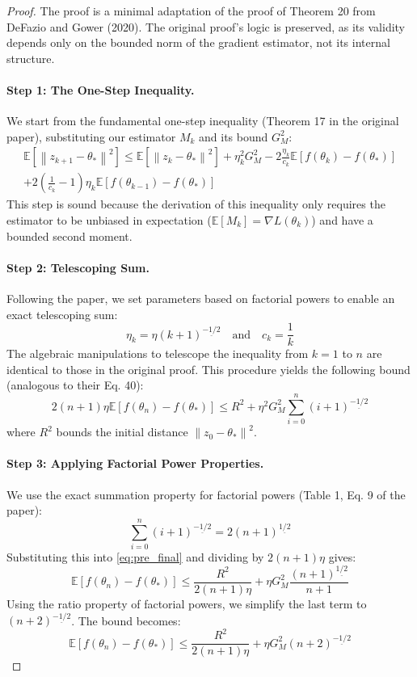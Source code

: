 \documentclass{article}
\newcommand{\E}{\mathbb{E}}
\newcommand{\norm}[1]{\left\lVert#1\right\rVert}
\newcommand{\grad}{\nabla}
\begin{document}
\begin{proof}
The proof is a minimal adaptation of the proof of Theorem 20 from DeFazio and Gower (2020). The original proof's logic is preserved, as its validity depends only on the bounded norm of the gradient estimator, not its internal structure.

\paragraph{Step 1: The One-Step Inequality.}
We start from the fundamental one-step inequality (Theorem 17 in the original paper), substituting our estimator \(M_k\) and its bound \(G_M^2\):
\begin{align}
    \E[\norm{z_{k+1} - \theta_*}^2] \le \E[\norm{z_k - \theta_*}^2] + \eta_k^2 G_M^2 - 2\frac{\eta_k}{c_k}\E[f(\theta_k) - f(\theta_*)] \nonumber \\
    + 2\left(\frac{1}{c_k}-1\right)\eta_k \E[f(\theta_{k-1}) - f(\theta_*)] \label{eq:onestep}
\end{align}
This step is sound because the derivation of this inequality only requires the estimator to be unbiased in expectation (\(\E[M_k] = \grad L(\theta_k)\)) and have a bounded second moment.

\paragraph{Step 2: Telescoping Sum.}
Following the paper, we set parameters based on factorial powers to enable an exact telescoping sum:
\[ \eta_k = \eta (k+1)^{\underline{-1/2}} \quad \text{and} \quad c_k = \frac{1}{k} \]
The algebraic manipulations to telescope the inequality from \(k=1\) to \(n\) are identical to those in the original proof. This procedure yields the following bound (analogous to their Eq. 40):
\begin{equation}
    2(n+1)\eta\E[f(\theta_n) - f(\theta_*)] \le R^2 + \eta^2 G_M^2 \sum_{i=0}^n (i+1)^{\underline{-1/2}} \label{eq:pre_final}
\end{equation}
where \(R^2\) bounds the initial distance \(\norm{z_0 - \theta_*}^2\).

\paragraph{Step 3: Applying Factorial Power Properties.}
We use the exact summation property for factorial powers (Table 1, Eq. 9 of the paper):
\[ \sum_{i=0}^n (i+1)^{\underline{-1/2}} = 2(n+1)^{\underline{1/2}} \]
Substituting this into \eqref{eq:pre_final} and dividing by \(2(n+1)\eta\) gives:
\[ \E[f(\theta_n) - f(\theta_*)] \le \frac{R^2}{2(n+1)\eta} + \eta G_M^2 \frac{(n+1)^{\underline{1/2}}}{n+1} \]
Using the ratio property of factorial powers, we simplify the last term to \((n+2)^{\underline{-1/2}}\). The bound becomes:
\[ \E[f(\theta_n) - f(\theta_*)] \le \frac{R^2}{2(n+1)\eta} + \eta G_M^2 (n+2)^{\underline{-1/2}} \]


\end{proof}
\end{document}

